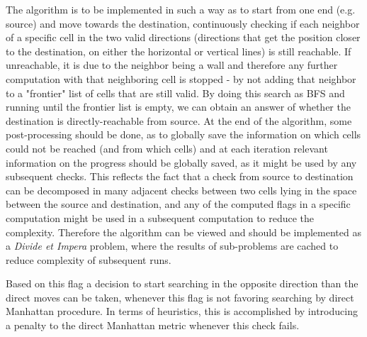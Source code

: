 \documentclass[letterpaper]{article}
\begin{document}
The algorithm is to be implemented in such a way as to start from one end (e.g. source) and move towards the destination, continuously checking if each neighbor of a specific cell in the two valid directions (directions that get the position closer to the destination, on either the horizontal or vertical lines) is still reachable. If unreachable, it is due to the neighbor being a wall and therefore any further computation with that neighboring cell is stopped - by not adding that neighbor to a "frontier" list of cells that are still valid. By doing this search as BFS and running until the frontier list is empty, we can obtain an answer of whether the destination is directly-reachable from source. At the end of the algorithm, some post-processing should be done, as to globally save the information on which cells could not be reached (and from which cells) and at each iteration relevant information on the progress should be globally saved, as it might be used by any subsequent checks. This reflects the fact that a check from source to destination can be decomposed in many adjacent checks between two cells lying in the space between the source and destination, and any of the computed flags in a specific computation might be used in a subsequent computation to reduce the complexity. Therefore the algorithm can be viewed and should be implemented as a \textit{Divide et Impera} problem, where the results of sub-problems are cached to reduce complexity of subsequent runs.

Based on this flag a decision to start searching in the opposite direction than the direct moves can be taken, whenever this flag is not favoring searching by direct Manhattan procedure. In terms of heuristics, this is accomplished by introducing a penalty to the direct Manhattan metric whenever this check fails.





\end{document}
